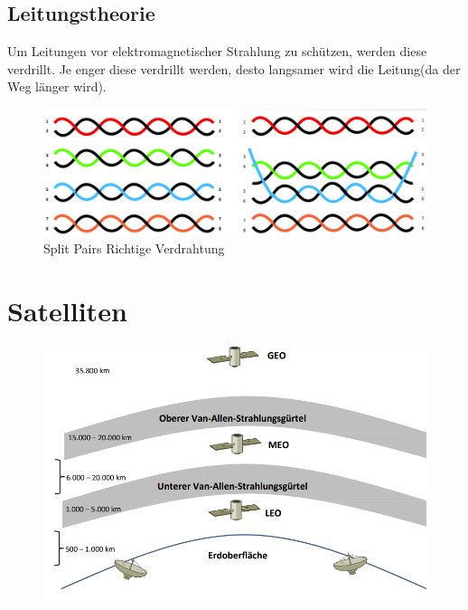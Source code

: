 \documentclass[12pt,a4paper]{article}
\begin{document}
		\subsection{Leitungstheorie}
			Um Leitungen vor elektromagnetischer Strahlung zu schützen, werden diese verdrillt. Je enger diese verdrillt werden, desto langsamer wird die Leitung(da der Weg länger wird).
			\begin{center}
				\begin{figure}[!h]
					\includegraphics[width=\textwidth]{Bilder/verdrillte-kabel.PNG}
					Split Pairs \hspace{0.4\textwidth} Richtige Verdrahtung
				\end{figure}
			\end{center}

	\section{Satelliten}
	\begin{center}
		\begin{figure}[!h]
			\includegraphics[width=\textwidth]{Bilder/Satelliten.png}
		\end{figure}
	\end{center}
\end{document}
